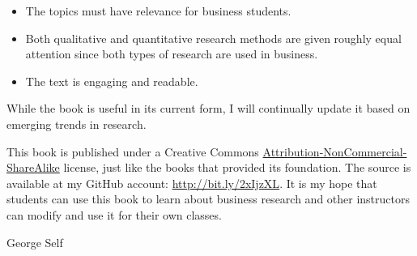 \begin{itemize}
	\item The topics must have relevance for business students. 
	\item Both qualitative and quantitative research methods are given roughly equal attention since both types of research are used in business. 
	\item The text is engaging and readable.
\end{itemize}

While the book is useful in its current form, I will continually update it based on emerging trends in research. 

This book is published under a Creative Commons \href{https://creativecommons.org/licenses/by-nc-sa/4.0/legalcode}{ Attribution-NonCommercial-ShareAlike} license, just like the books that provided its foundation. The source is available at my GitHub account: \url{http://bit.ly/2xIjzXL}. It is my hope that students can use this book to learn about business research and other instructors can modify and use it for their own classes.

\bigskip
\begin{flushright}
  \textemdash \; George Self
\end{flushright}
